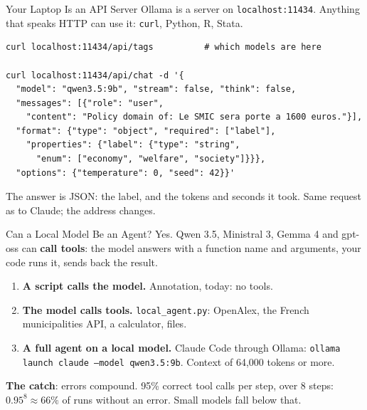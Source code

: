 \documentclass[svgnames,x11names,dvipsnames]{beamer}
\newcommand{\chg}[1]{{\bfseries #1}}
\renewcommand{\chg}[1]{#1}
\begin{document}
\begin{frame}[fragile]{\chg{Your Laptop Is an API Server}}
\small
Ollama is a server on \texttt{localhost:11434}. Anything that speaks HTTP can use it: \texttt{curl}, Python, R, Stata.

\vspace{0.2cm}
{\scriptsize
\begin{verbatim}
curl localhost:11434/api/tags          # which models are here

curl localhost:11434/api/chat -d '{
  "model": "qwen3.5:9b", "stream": false, "think": false,
  "messages": [{"role": "user",
    "content": "Policy domain of: Le SMIC sera porte a 1600 euros."}],
  "format": {"type": "object", "required": ["label"],
    "properties": {"label": {"type": "string",
      "enum": ["economy", "welfare", "society"]}}},
  "options": {"temperature": 0, "seed": 42}}'
\end{verbatim}}

\vspace{0.1cm}
The answer is JSON: the label, and the tokens and seconds it took. Same request as to Claude; the address changes.
\end{frame}

\begin{frame}{\chg{Can a Local Model Be an Agent?}}
\small
Yes. Qwen 3.5, Ministral 3, Gemma 4 and gpt-oss can \textbf{call tools}: the model answers with a function name and arguments, your code runs it, sends back the result.

\vspace{0.3cm}
\begin{enumerate}
    \setlength{\itemsep}{5pt}
    \item \textbf{A script calls the model.} Annotation, today: no tools.
    \item \textbf{The model calls tools.} \texttt{local\_agent.py}: OpenAlex, the French municipalities API, a calculator, files.
    \item \textbf{A full agent on a local model.} Claude Code through Ollama: \texttt{ollama launch claude --model qwen3.5:9b}. \chg{Context of 64,000 tokens or more.}
\end{enumerate}

\vspace{0.3cm}
\textbf{The catch}: errors compound. 95\% correct tool calls per step, over 8 steps: $0.95^8 \approx 66\%$ of runs without an error. Small models fall below that.
\end{frame}
\end{document}
